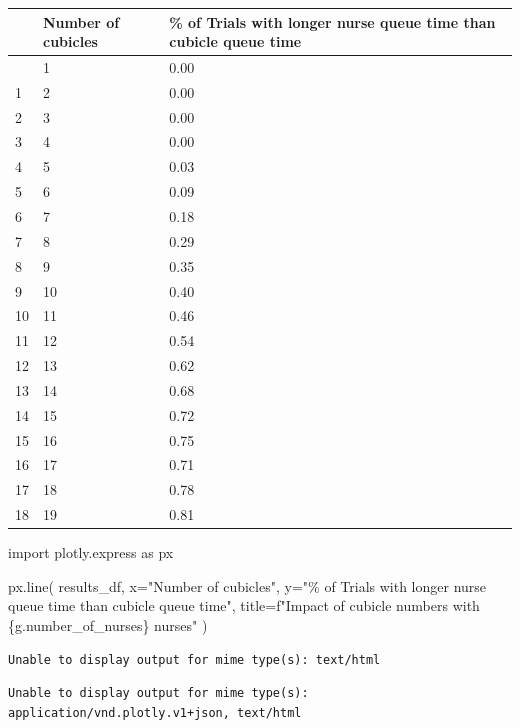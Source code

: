 \documentclass[
  letterpaper,
  DIV=11,
  numbers=noendperiod]{scrreprt}
\newenvironment{Shaded}{\begin{snugshade}}{\end{snugshade}}
\newcommand{\ImportTok}[1]{\textcolor[rgb]{0.00,0.46,0.62}{#1}}
\newcommand{\NormalTok}[1]{\textcolor[rgb]{0.00,0.23,0.31}{#1}}
\newcommand{\OperatorTok}[1]{\textcolor[rgb]{0.37,0.37,0.37}{#1}}
\newcommand{\SpecialCharTok}[1]{\textcolor[rgb]{0.37,0.37,0.37}{#1}}
\newcommand{\SpecialStringTok}[1]{\textcolor[rgb]{0.13,0.47,0.30}{#1}}
\newcommand{\StringTok}[1]{\textcolor[rgb]{0.13,0.47,0.30}{#1}}
\begin{document}
\begin{longtable}[]{@{}lll@{}}
\toprule\noalign{}
& Number of cubicles & \% of Trials with longer nurse queue time than
cubicle queue time \\
\midrule\noalign{}
\endhead
\bottomrule\noalign{}
\endlastfoot
0 & 1 & 0.00 \\
1 & 2 & 0.00 \\
2 & 3 & 0.00 \\
3 & 4 & 0.00 \\
4 & 5 & 0.03 \\
5 & 6 & 0.09 \\
6 & 7 & 0.18 \\
7 & 8 & 0.29 \\
8 & 9 & 0.35 \\
9 & 10 & 0.40 \\
10 & 11 & 0.46 \\
11 & 12 & 0.54 \\
12 & 13 & 0.62 \\
13 & 14 & 0.68 \\
14 & 15 & 0.72 \\
15 & 16 & 0.75 \\
16 & 17 & 0.71 \\
17 & 18 & 0.78 \\
18 & 19 & 0.81 \\
\end{longtable}

\begin{Shaded}
\begin{Highlighting}[]
\ImportTok{import}\NormalTok{ plotly.express }\ImportTok{as}\NormalTok{ px}

\NormalTok{px.line(}
\NormalTok{  results\_df,}
\NormalTok{  x}\OperatorTok{=}\StringTok{"Number of cubicles"}\NormalTok{,}
\NormalTok{  y}\OperatorTok{=}\StringTok{"}\SpecialCharTok{\% o}\StringTok{f Trials with longer nurse queue time than cubicle queue time"}\NormalTok{,}
\NormalTok{  title}\OperatorTok{=}\SpecialStringTok{f"Impact of cubicle numbers with }\SpecialCharTok{\{}\NormalTok{g}\SpecialCharTok{.}\NormalTok{number\_of\_nurses}\SpecialCharTok{\}}\SpecialStringTok{ nurses"}
\NormalTok{  )}
\end{Highlighting}
\end{Shaded}

\begin{verbatim}
Unable to display output for mime type(s): text/html
\end{verbatim}

\begin{verbatim}
Unable to display output for mime type(s): application/vnd.plotly.v1+json, text/html
\end{verbatim}
\end{document}

